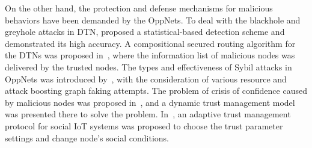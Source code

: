On the other hand,
the protection and defense mechanisms for malicious behaviors have
been demanded by the OppNets.
To deal with the blackhole and greyhole attacks
in DTN,
\cite{Pham2016Detecting} proposed a statistical-based detection scheme and
demonstrated its high accuracy.
A compositional secured routing algorithm for the DTNs
was proposed in~\cite{Saha2018Design},
where the information list of malicious nodes was delivered by the trusted nodes.
The types and effectiveness of Sybil attacks in OppNets
was introduced by~\cite{Sacha2016Stalk},
with the consideration of various resource and
attack boosting graph faking attempts.
The problem of crisis of confidence caused by malicious nodes
was proposed in~\cite{Yao2016Secure},
and a dynamic trust management model
was presented there to solve the problem.
In~\cite{Chen2016Trust},
an adaptive trust management
protocol for social IoT systems was proposed
to choose the trust parameter settings and change node's social conditions.
%
